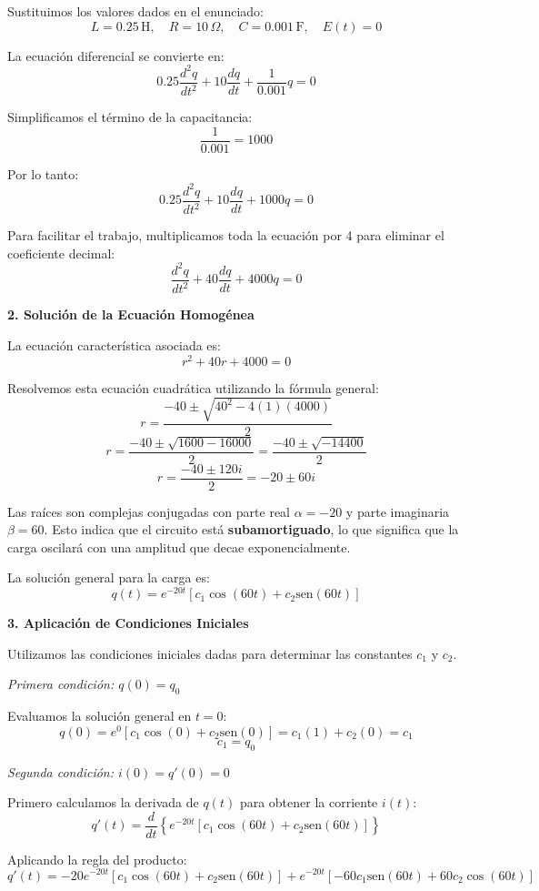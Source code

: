 \documentclass[a4paper]{article}
\begin{document}
Sustituimos los valores dados en el enunciado:
$$
L = 0.25 \, \text{H}, \quad R = 10 \, \Omega, \quad C = 0.001 \, \text{F}, \quad E(t) = 0
$$

La ecuación diferencial se convierte en:
$$
0.25\frac{d^2q}{dt^2} + 10\frac{dq}{dt} + \frac{1}{0.001}q = 0
$$

Simplificamos el término de la capacitancia:
$$
\frac{1}{0.001} = 1000
$$

Por lo tanto:
$$
0.25\frac{d^2q}{dt^2} + 10\frac{dq}{dt} + 1000q = 0
$$

Para facilitar el trabajo, multiplicamos toda la ecuación por 4 para eliminar el coeficiente decimal:
$$
\frac{d^2q}{dt^2} + 40\frac{dq}{dt} + 4000q = 0
$$

\textbf{2. Solución de la Ecuación Homogénea}

La ecuación característica asociada es:
$$
r^2 + 40r + 4000 = 0
$$

Resolvemos esta ecuación cuadrática utilizando la fórmula general:
$$
r = \frac{-40 \pm \sqrt{40^2 - 4(1)(4000)}}{2}
$$
$$
r = \frac{-40 \pm \sqrt{1600 - 16000}}{2} = \frac{-40 \pm \sqrt{-14400}}{2}
$$
$$
r = \frac{-40 \pm 120i}{2} = -20 \pm 60i
$$

Las raíces son complejas conjugadas con parte real $\alpha = -20$ y parte imaginaria $\beta = 60$. Esto indica que el circuito está \textbf{subamortiguado}, lo que significa que la carga oscilará con una amplitud que decae exponencialmente.

La solución general para la carga es:
$$
q(t) = e^{-20t}[c_1 \cos(60t) + c_2 \text{sen}(60t)]
$$

\textbf{3. Aplicación de Condiciones Iniciales}

Utilizamos las condiciones iniciales dadas para determinar las constantes $c_1$ y $c_2$.

\textit{Primera condición: $q(0) = q_0$}

Evaluamos la solución general en $t = 0$:
$$
q(0) = e^{0}[c_1 \cos(0) + c_2 \text{sen}(0)] = c_1(1) + c_2(0) = c_1
$$
$$
c_1 = q_0
$$

\textit{Segunda condición: $i(0) = q'(0) = 0$}

Primero calculamos la derivada de $q(t)$ para obtener la corriente $i(t)$:
$$
q'(t) = \frac{d}{dt}\left\{ e^{-20t}[c_1 \cos(60t) + c_2 \text{sen}(60t)] \right\}
$$

Aplicando la regla del producto:
$$
q'(t) = -20e^{-20t}[c_1 \cos(60t) + c_2 \text{sen}(60t)] + e^{-20t}[-60c_1 \text{sen}(60t) + 60c_2 \cos(60t)]
$$
\end{document}
